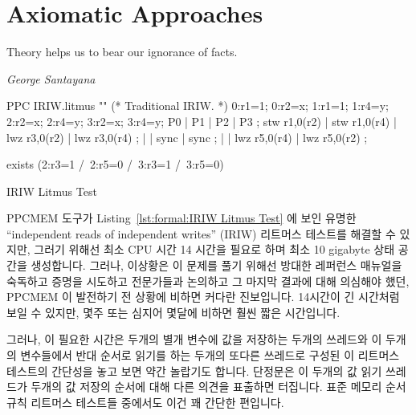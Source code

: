 
\section{Axiomatic Approaches}
\label{sec:formal:Axiomatic Approaches}
%
\epigraph{Theory helps us to bear our ignorance of facts.}
	{\emph{George Santayana}}

\begin{listing}[tb]
\begin{fcvlabel}
\begin{VerbatimL}[commandchars=\%\@\$]
PPC IRIW.litmus
""
(* Traditional IRIW. *)
{
0:r1=1; 0:r2=x;
1:r1=1;         1:r4=y;
        2:r2=x; 2:r4=y;
        3:r2=x; 3:r4=y;
}
P0           | P1           | P2           | P3           ;
stw r1,0(r2) | stw r1,0(r4) | lwz r3,0(r2) | lwz r3,0(r4) ;
             |              | sync         | sync         ;
             |              | lwz r5,0(r4) | lwz r5,0(r2) ;

exists
(2:r3=1 /\ 2:r5=0 /\ 3:r3=1 /\ 3:r5=0)
\end{VerbatimL}
\end{fcvlabel}
\caption{IRIW Litmus Test}
\label{lst:formal:IRIW Litmus Test}
\end{listing}

PPCMEM 도구가 Listing~\ref{lst:formal:IRIW Litmus Test} 에 보인 유명한
``independent reads of independent writes'' (IRIW) 리트머스 테스트를 해결할 수
있지만, 그러기 위해선 최소 CPU 시간 14 시간을 필요로 하며 최소 10 gigabyte 상태
공간을 생성합니다.
그러나, 이상황은 이 문제를 풀기 위해선 방대한 레퍼런스 매뉴얼을 숙독하고 증명을
시도하고 전문가들과 논의하고 그 마지막 결과에 대해 의심해야 했던,  PPCMEM 이
발전하기 전 상황에 비하면 커다란 진보입니다.
14시간이 긴 시간처럼 보일 수 있지만, 몇주 또는 심지어 몇달에 비하면 훨씬 짧은
시간입니다.

그러나, 이 필요한 시간은 두개의 별개 변수에 값을 저장하는 두개의 쓰레드와 이
두개의 변수들에서 반대 순서로 읽기를 하는 두개의 또다른 쓰레드로 구성된 이
리트머스 테스트의 간단성을 놓고 보면 약간 놀랍기도 합니다.
단정문은 이 두개의 값 읽기 쓰레드가 두개의 값 저장의 순서에 대해 다른 의견을
표출하면 터집니다.
표준 메모리 순서 규칙 리트머스 테스트들 중에서도 이건 꽤 간단한 편입니다.

\iffalse

